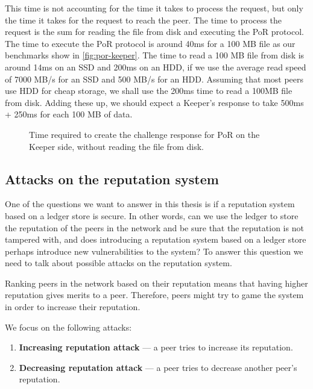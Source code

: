 This time is not accounting for the time it takes to process the request, but only the time it takes for the
request to reach the peer.
The time to process the request is the sum for reading the file from disk and executing the PoR protocol.
The time to execute the PoR protocol is around 40ms for a 100 MB file as our benchmarks show in \autoref{fig:por-keeper}.
The time to read a 100 MB file from disk is around 14ms on an SSD and 200ms on an HDD, if we
use the average read speed of 7000 MB/s for an SSD and 500 MB/s for an HDD.
Assuming that most peers use HDD for cheap storage, we shall use the 200ms time to read a 100MB file from disk.
Adding these up, we should expect a Keeper's response to take 500ms + 250ms for each 100 MB of data.

\begin{figure}
  \myfloatalign
  \caption[]{Time required to create the challenge response for PoR on the Keeper side, without reading the file from disk.}
  \label{fig:por-keeper}
\end{figure}

\subsection{Attacks on the reputation system}

One of the questions we want to answer in this thesis is if a reputation system based
on a ledger store is secure.
In other words, can we use the ledger to store the reputation of the peers in the network and be sure that
the reputation is not tampered with,
and does introducing a reputation system based on a ledger store
perhaps introduce new vulnerabilities to the system?
To answer this question we need to talk about possible attacks on the reputation system.

Ranking peers in the network based on their reputation means that 
having higher reputation gives merits to a peer.
Therefore, peers might try to game the system in order to increase their reputation.

We focus on the following attacks:
\begin{enumerate}
    \item \textbf{Increasing reputation attack} --- a peer tries to increase its reputation.
    \item \textbf{Decreasing reputation attack} --- a peer tries to decrease another peer's reputation.
\end{enumerate}

